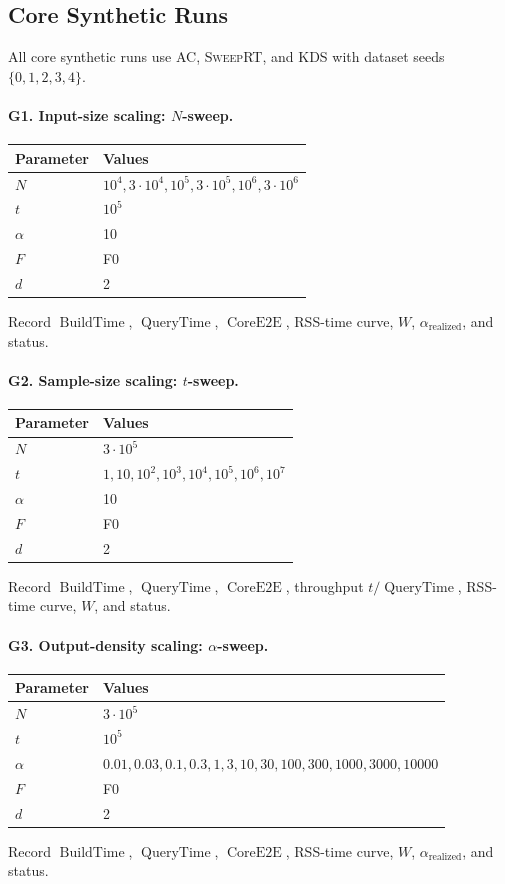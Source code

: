 \documentclass[11pt]{article}
\newcommand{\AC}{\textsc{AC}}
\newcommand{\SweepRT}{\textsc{SweepRT}}
\newcommand{\KDS}{\textsc{KDS}}
\newcommand{\BuildTime}{\ensuremath{\operatorname{BuildTime}}}
\newcommand{\QueryTime}{\ensuremath{\operatorname{QueryTime}}}
\newcommand{\CoreE}{\ensuremath{\operatorname{CoreE2E}}}
\begin{document}
\subsection{Core Synthetic Runs}
All core synthetic runs use \AC, \SweepRT, and \KDS{} with dataset seeds $\{0,1,2,3,4\}$.

\paragraph{G1. Input-size scaling: $N$-sweep.}
\begin{center}
\begin{tabularx}{0.82\linewidth}{@{}lY@{}}
\toprule
Parameter & Values \\
\midrule
$N$ & $10^4,3\cdot10^4,10^5,3\cdot10^5,10^6,3\cdot10^6$ \\
$t$ & $10^5$ \\
$\alpha$ & 10 \\
$F$ & F0 \\
$d$ & 2 \\
\bottomrule
\end{tabularx}
\end{center}
Record \BuildTime, \QueryTime, \CoreE, RSS-time curve, $W$, $\alpha_{\mathrm{realized}}$, and status.

\paragraph{G2. Sample-size scaling: $t$-sweep.}
\begin{center}
\begin{tabularx}{0.82\linewidth}{@{}lY@{}}
\toprule
Parameter & Values \\
\midrule
$N$ & $3\cdot10^5$ \\
$t$ & $1,10,10^2,10^3,10^4,10^5,10^6,10^7$ \\
$\alpha$ & 10 \\
$F$ & F0 \\
$d$ & 2 \\
\bottomrule
\end{tabularx}
\end{center}
Record \BuildTime, \QueryTime, \CoreE, throughput $t/\QueryTime$, RSS-time curve, $W$, and status.

\paragraph{G3. Output-density scaling: $\alpha$-sweep.}
\begin{center}
\begin{tabularx}{0.82\linewidth}{@{}lY@{}}
\toprule
Parameter & Values \\
\midrule
$N$ & $3\cdot10^5$ \\
$t$ & $10^5$ \\
$\alpha$ & $0.01,0.03,0.1,0.3,1,3,10,30,100,300,1000,3000,10000$ \\
$F$ & F0 \\
$d$ & 2 \\
\bottomrule
\end{tabularx}
\end{center}
Record \BuildTime, \QueryTime, \CoreE, RSS-time curve, $W$, $\alpha_{\mathrm{realized}}$, and status.
\end{document}
